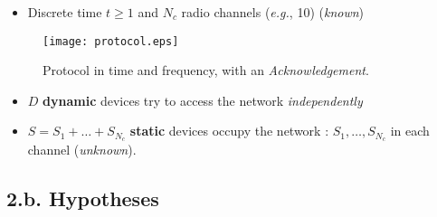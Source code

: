 \begin{frameO}[Model]

    \begin{itemize}\tightlist
        \item
              Discrete time \(t\geq1\) and \(N_c\) radio channels (\emph{e.g.}, 10)
              \hfill{} (\emph{known})
    \end{itemize}

    \begin{figure}[h!]
        \centering
        \texttt{[image: protocol.eps]}
        \caption{\small{Protocol in time and frequency, with an \emph{Acknowledgement}.}}
    \end{figure}

    \begin{itemize}\tightlist
        \item
              \(D\) \textbf{dynamic} devices try to access the network
              \emph{independently}
        \item
              \(S=S_1+\dots+S_{N_c}\) \textbf{static} devices occupy the network :
              \newline
              \(S_1,\dots,S_{N_c}\) in each channel \hfill{} (\emph{unknown}).
    \end{itemize}

\end{frameO}



\subsection{\hfill{}2.b. Hypotheses\hfill{}}

